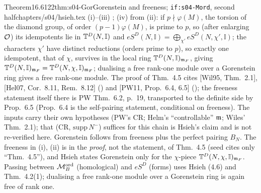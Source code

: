 \begin{quoted}{Theorem}{16.6}{122}{thm:s04-Gor}{Gorenstein and freeness; \texttt{if:s04-Mord}, second half}{chapters/s04/hsieh.tex}
\noindent\stcited{} (i)--(iii) \cite[{Thm.~4.5 and its proof, p.~34}]{Hs};
(iv) \stproved{} from (ii): if $p\nmid\varphi(M)$, the torsion of the diamond group, of order $(p-1)\varphi(M)$, is prime to $p$, so
(after enlarging $\mathcal{O}$) its idempotents lie in $\mathbb{T}^D(N,\mathbb I)$ and $eS^D(N,\mathbb I)=\bigoplus_{\chi'}eS^D(N,\chi',\mathbb I)$; the
characters $\chi'$ have distinct reductions (orders prime to $p$), so exactly one idempotent, that of $\chi$, survives in the local ring
$\mathbb{T}^D(N,\mathbb I)_{\mathfrak{m}_F}$, giving $\mathbb{T}^D(N,\mathbb I)_{\mathfrak{m}_F}=\mathbb{T}^D(N,\chi,\mathbb I)_{\mathfrak{m}_F}$; dualising a free rank-one module over a
Gorenstein ring gives a free rank-one module. The proof of Thm.~4.5 cites [Wil95, Thm.~2.1], [Hel07, Cor.~8.11, Rem.~8.12]
(\cite[{Cor.~8.11 and Rem.~8.12, p.~31; journal
version p.~110, not checked here}]{Hel04}) and [PW11, Prop.~6.4, 6.5]
(\cite[{Prop.~6.4, p.~19; Prop.~6.5, p.~20}]{PW}); the
freeness statement itself there is PW Thm.~6.2, p.~19, transported to the definite side by Prop.~6.5 (Prop.~6.4 is the self-pairing
statement, conditional on freeness). The inputs carry their own hypotheses (PW's CR; Helm's ``controllable'' $\mathfrak{m}$; Wiles' Thm.~2.1);
that (CR, $\mathrm{supp}\,N^-$) suffices for this chain is Hsieh's claim and is not re-verified here. Gorenstein
follows from freeness plus the perfect pairing $B_N$. The freeness in (i), (ii) is in the \emph{proof}, not the statement, of
Thm.~4.5 (seed cites only ``Thm.~4.5''), and Hsieh states Gorenstein only for the $\chi$-piece $\mathbb{T}^D(N,\chi,\mathbb I)_{\mathfrak{m}_F}$. Passing between $\mathcal{M}^{\mathrm{ord}}_B$ (homological) and $eS^D$ (forms) uses Hsieh (4.6) and
Thm.~4.2(1); dualising a free rank-one module over a Gorenstein ring is again free of rank one.
\end{quoted}
